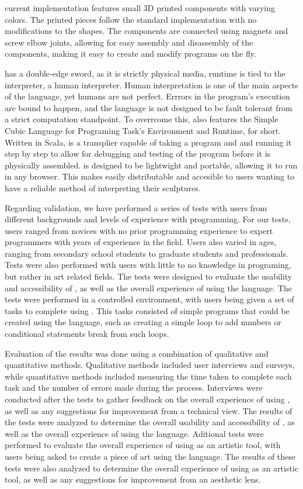 \sculpt current implementation features small 3D printed components with varying colors.
The printed pieces follow the standard \sculpt implementation with no modifications to the shapes.
The components are connected using magnets and screw elbow joints, allowing for easy assembly and disassembly of the components, making it easy to create and modify programs on the fly.

\sculpt has a double-edge sword, as it is strictly physical media, runtime is tied to the interpreter, a human interpreter.
Human interpretation is one of the main aspects of the language, yet humans are not perfect. Errrors in the program's execution are bound to happen, and the language is not designed to be fault tolerant from a strict computation standpoint.
To overrcome this, \sculpt also features the Simple Cubic Language for Programing Task's Environment and Runtime, \sculpter for short.
Written in Scala, \sculpter is a transplier capable of taking a \sculpt program and and running it step by step to allow for debugging and testing of the program before it is physically assembled.
\sculpter is designed to be lightwight and portable, allowing it to run in any browser. This makes easily distributable and accesible to users wanting to have a reliable method of interpreting their sculptures.


Regarding validation, we have performed a series of tests with users from different backgrounds and levels of experience with programming.
For our tests, users ranged from novices with no prior programming experience to expert programmers with years of experience in the field.
Users also varied in ages, ranging from secondary school students to graduate students and professionals.
Tests were also performed with users with little to no knowledge in programing, but rather in art related fields.
The tests were designed to evaluate the usability and accessibility of \sculpt, as well as the overall experience of using the language.
The tests were performed in a controlled environment, with users being given a set of tasks to complete using \sculpt.
This tasks consisted of simple programs that could be created using the language, such as creating a simple loop to add numbers or conditional statements break from such loops.

Evaluation of the results was done using a combination of qualitative and quantitative methods.
Qualitative methods included user interviews and surveys, while quantitative methods included measuring the time taken to complete each task and the number of errors made during the process.
Interviews were conducted after the tests to gather feedback on the overall experience of using \sculpt, as well as any suggestions for improvement from a technical view.
The results of the tests were analyzed to determine the overall usability and accessibility of \sculpt, as well as the overall experience of using the language.
Aditional tests were performed to evaluate the overall experience of using \sculpt as an artistic tool, with users being asked to create a piece of art using the language.
The results of these tests were also analyzed to determine the overall experience of using \sculpt as an artistic tool, as well as any suggestions for improvement from an aesthetic lens.
\endinput